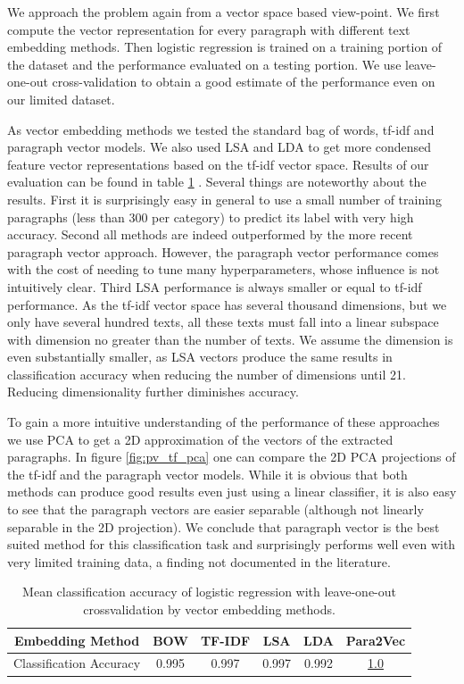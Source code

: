 We approach the problem again from a vector space based view-point. We first compute the vector representation for every paragraph with different text embedding methods. Then logistic regression is trained on a training portion of the dataset and the performance evaluated on a testing portion. We use leave-one-out cross-validation to obtain a good estimate of the performance even on our limited dataset.

As vector embedding methods we tested the standard bag of words, tf-idf and paragraph vector models. We also used LSA and LDA to get more condensed feature vector representations based on the tf-idf vector space. Results of our evaluation can be found in table \ref{table:para_class_acc}   . Several things are noteworthy about the results. First it is surprisingly easy in general to use a small number of training paragraphs (less than 300 per category) to predict its label with very high accuracy. Second all methods are indeed outperformed by the more recent paragraph vector approach. However, the paragraph vector performance comes with the cost of needing to tune many hyperparameters, whose influence is not intuitively clear. Third LSA performance is always smaller or equal to tf-idf performance. As the tf-idf vector space has several thousand dimensions, but we only have several hundred texts, all these texts must fall into a linear subspace with dimension no greater than the number of texts. We assume the dimension is even substantially smaller, as LSA vectors produce the same results in classification accuracy when reducing the number of dimensions until 21. Reducing dimensionality further diminishes accuracy. 

To gain a more intuitive understanding of the performance of these approaches we use PCA to get a 2D approximation of the vectors of the extracted paragraphs. In figure \ref{fig:pv_tf_pca} one can compare the 2D PCA projections of the tf-idf and the paragraph vector models. While it is obvious that both methods can produce good results even just using a linear classifier, it is also easy to see that the paragraph vectors are easier separable (although not linearly separable in the 2D projection). We conclude that paragraph vector is the best suited method for this classification task and surprisingly performs well even with very limited training data, a finding not documented in the literature.
\begin{table}
	\begin{tabular}{|c|c|c|c|c|c|}
		\hline 
		Embedding Method & BOW & TF-IDF & LSA & LDA  & Para2Vec\tabularnewline
		\hline 
		\hline 
		Classification Accuracy & 0.995 & 0.997 & 0.997 & 0.992 & \underline{1.0}\tabularnewline
		\hline 
	\end{tabular}
	\caption{Mean classification accuracy of logistic regression with leave-one-out crossvalidation by vector embedding methods.}
	\label{table:para_class_acc}
\end{table}

